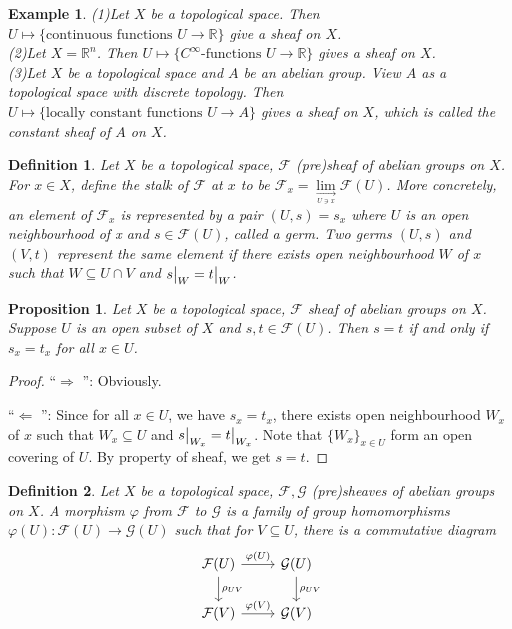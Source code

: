 \documentclass{ctexart}
\newtheorem{definition}{Definition}[section]
\newtheorem{proposition}{Proposition}[section]
\newtheorem{example}{Example}[section]
\newcommand{\leftquotes}{\textquotedblleft}
\newcommand{\rightquotes}{\textquotedblright}
\begin{document}
\begin{example}
    (1)Let $X$ be a topological space.
    Then $U \longmapsto \{\text{continuous functions $U \longrightarrow \mathbb{R}$}\}$ give a sheaf on $X$. \\
    (2)Let $X = \mathbb{R}^{n}$.
    Then $U \longmapsto \{\text{$C^{\infty}$-functions $U \longrightarrow \mathbb{R}$}\}$ gives a sheaf on $X$. \\
    (3)Let $X$ be a topological space and $A$ be an abelian group.
    View $A$ as a topological space with discrete topology.
    Then $U \longmapsto \{\text{locally constant functions $U \longrightarrow A$}\}$ gives a sheaf on $X$, which is called the constant sheaf of $A$ on $X$.
\end{example}
\begin{definition}
    Let $X$ be a topological space, $\mathcal{F}$ (pre)sheaf of abelian groups on $X$.
    For $x\in X$, define the stalk of $\mathcal{F}$ at $x$ to be $\mathcal{F}_{x} = \underset{\underset{U\ni x}{\longrightarrow}}{\lim} \mathcal{F}(U)$.
    More concretely, an element of $\mathcal{F}_{x}$ is represented by a pair $(U, s) = s_{x}$ where $U$ is an open neighbourhood of x and $s\in \mathcal{F}(U)$, called a germ.
    Two germs $(U, s)$ and $(V, t)$ represent the same element if there exists open neighbourhood $W$ of $x$ such that $W \subseteq U \cap V$ and $s\big{|}_{W} = t\big{|}_{W}$.
\end{definition}
\begin{proposition}
    Let $X$ be a topological space, $\mathcal{F}$ sheaf of abelian groups on $X$.
    Suppose $U$ is an open subset of $X$ and $s,t\in \mathcal{F}(U)$.
    Then $s = t$ if and only if $s_{x} = t_{x}$ for all $x\in U$.
    \label{Proposition 1.1}
\end{proposition}
\begin{proof}
    \leftquotes $\Rightarrow$ \rightquotes : Obviously.
    \par
    \leftquotes $\Leftarrow$ \rightquotes : Since for all $x\in U$, we have $s_{x} = t_{x}$,
    there exists open neighbourhood $W_{x}$ of $x$ such that $W_{x} \subseteq U$ and $s\big{|}_{W_{x}} = t\big{|}_{W_{x}}$.
    Note that $\{W_{x}\}_{x\in U}$ form an open covering of $U$.
    By property of sheaf, we get $s = t$.
\end{proof}
\begin{definition}
    Let $X$ be a topological space, $\mathcal{F}, \mathcal{G}$ (pre)sheaves of abelian groups on $X$.
    A morphism $\varphi$ from $\mathcal{F}$ to $\mathcal{G}$ is a family of group homomorphisms $\varphi(U): \mathcal{F}(U) \longrightarrow \mathcal{G}(U)$ such that for $V \subseteq U$,
    there is a commutative diagram
    \begin{equation}
        \begin{tikzcd}
            \mathcal{F}(U) \arrow[r, "\varphi(U)"] \arrow[d, "\rho_{UV}"] &
            \mathcal{G}(U) \arrow[d, "\rho_{UV}"] \\
            \mathcal{F}(V) \arrow[r, "\varphi(V)"] &
            \mathcal{G}(V)
        \end{tikzcd}
    \end{equation}
\end{definition}
\end{document}
